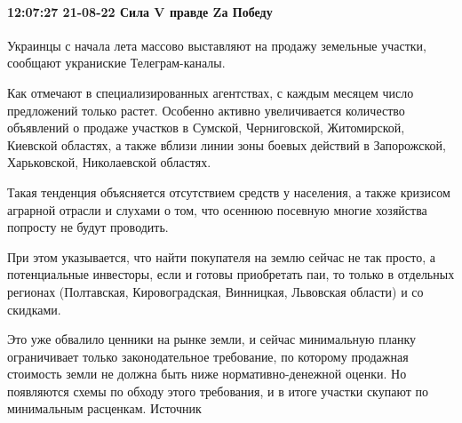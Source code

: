  
 
 
 
 

\paragraph{12:07:27 21-08-22 Сила V правде Zа Победу 💚💕}

Украинцы с начала лета массово выставляют на продажу земельные участки,
сообщают украниские Телеграм-каналы.

Как отмечают в специализированных агентствах, с каждым месяцем число
предложений только растет. Особенно активно увеличивается количество объявлений
о продаже участков в Сумской, Черниговской, Житомирской, Киевской областях, а
также вблизи линии зоны боевых действий в Запорожской, Харьковской,
Николаевской областях.

Такая тенденция объясняется отсутствием средств у населения, а также кризисом
аграрной отрасли и слухами о том, что осеннюю посевную многие хозяйства
попросту не будут проводить.

При этом указывается, что найти покупателя на землю сейчас не так просто, а
потенциальные инвесторы, если и готовы приобретать паи, то только в отдельных
регионах (Полтавская, Кировоградская, Винницкая, Львовская области) и со
скидками.

Это уже обвалило ценники на рынке земли, и сейчас минимальную планку
ограничивает только законодательное требование, по которому продажная стоимость
земли не должна быть ниже нормативно-денежной оценки. Но появляются схемы по
обходу этого требования, и в итоге участки скупают по минимальным расценкам.
Источник
